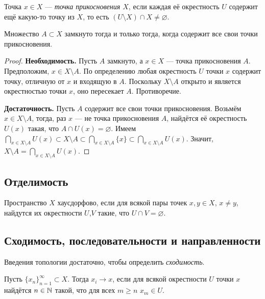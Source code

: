 \begin{defin}
	Точка $x\in X$ --- \textit{точка прикосновения $X$}, если каждая её окрестность $U$ содержит ещё какую-то точку из $X$, то есть $(U\setminus{X})\cap X\neq\varnothing$.
\end{defin}
\begin{prop}
	Множество $A\subset X$ замкнуто тогда и только тогда, когда содержит все свои точки прикосновения.
\end{prop}
\begin{proof}
	\textbf{Необходимость.} Пусть $A$ замкнуто, а $x\in X$ --- точка прикосновения $A$. Предположим, $x\in X\setminus A$. По определению любая окрестность $U$ точки $x$ содержит точку, отличную от $x$ и входящую в $A$. Поскольку $X\setminus A$ открыто и является окрестностью точки $x$, оно пересекает $A$. Противоречие.

	\textbf{Достаточность.} Пусть $A$ содержит все свои точки прикосновения. Возьмём $x\in X\setminus A$, тогда, раз $x$ --- не точка прикосновения $A$, найдётся её окрестность $U(x)$ такая, что $A\cap U(x)=\varnothing$. Имеем $\bigcap_{x\in X\setminus A} U(x)\subset X\setminus A\subset\bigcap_{x\in X\setminus A} \{x\}\subset\bigcap_{x\in X\setminus A} U(x)$. Значит, $X\setminus A=\bigcap_{x\in X\setminus A} U(x)$.
\end{proof}

\subsection{Отделимость}
\begin{defin}
	Пространство $X$ хаусдорфово, если для всякой пары точек $x,y\in X$, $x\neq y$, найдутся их окрестности $U$,$V$ такие, что $U\cap V=\varnothing$.
\end{defin}

\subsection{Сходимость, последовательности и направленности}
Введения топологии достаточно, чтобы определить \textit{сходимость}.
\begin{defin}
	Пусть $\{x_n\}_{n=1}^{\infty}\subset X$. Тогда $x_i\rightarrow x$, если для всякой окрестности $U$ точки $x$ найдётся $n\in\mathbb {N}$ такой, что для всех $m\geqslant n$ $x_m\in U$.
\end{defin}

